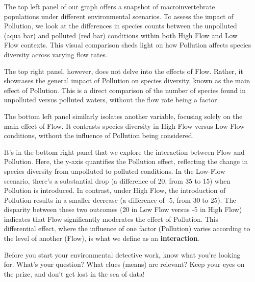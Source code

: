 \documentclass[
  letterpaper,
  DIV=11,
  numbers=noendperiod]{scrreprt}
\begin{document}
The top left panel of our graph offers a snapshot of macroinvertebrate
populations under different environmental scenarios. To assess the
impact of Pollution, we look at the differences in species counts
between the unpolluted (aqua bar) and polluted (red bar) conditions
within both High Flow and Low Flow contexts. This visual comparison
sheds light on how Pollution affects species diversity across varying
flow rates.

The top right panel, however, does not delve into the effects of Flow.
Rather, it showcases the general impact of Pollution on species
diversity, known as the main effect of Pollution. This is a direct
comparison of the number of species found in unpolluted versus polluted
waters, without the flow rate being a factor.

The bottom left panel similarly isolates another variable, focusing
solely on the main effect of Flow. It contrasts species diversity in
High Flow versus Low Flow conditions, without the influence of Pollution
being considered.

It's in the bottom right panel that we explore the interaction between
Flow and Pollution. Here, the y-axis quantifies the Pollution effect,
reflecting the change in species diversity from unpolluted to polluted
conditions. In the Low-Flow scenario, there's a substantial drop (a
difference of 20, from 35 to 15) when Pollution is introduced. In
contrast, under High Flow, the introduction of Pollution results in a
smaller decrease (a difference of -5, from 30 to 25). The disparity
between these two outcomes (20 in Low Flow versus -5 in High Flow)
indicates that Flow significantly moderates the effect of Pollution.
This differential effect, where the influence of one factor (Pollution)
varies according to the level of another (Flow), is what we define as an
\textbf{interaction}.

\begin{tcolorbox}[enhanced jigsaw, breakable, colback=white, opacitybacktitle=0.6, coltitle=black, toprule=.15mm, bottomtitle=1mm, leftrule=.75mm, arc=.35mm, title=\textcolor{quarto-callout-tip-color}{\faLightbulb}\hspace{0.5em}{Pro tip}, opacityback=0, colframe=quarto-callout-tip-color-frame, left=2mm, titlerule=0mm, toptitle=1mm, colbacktitle=quarto-callout-tip-color!10!white, rightrule=.15mm, bottomrule=.15mm]

Before you start your environmental detective work, know what you're
looking for. What's your question? What clues (means) are relevant? Keep
your eyes on the prize, and don't get lost in the sea of data!

\end{tcolorbox}
\end{document}
